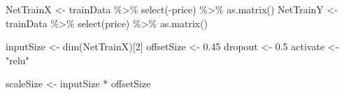 \documentclass[
]{article}
\newenvironment{Shaded}{\begin{snugshade}}{\end{snugshade}}
\newcommand{\DecValTok}[1]{\textcolor[rgb]{0.00,0.00,0.81}{#1}}
\newcommand{\FloatTok}[1]{\textcolor[rgb]{0.00,0.00,0.81}{#1}}
\newcommand{\FunctionTok}[1]{\textcolor[rgb]{0.00,0.00,0.00}{#1}}
\newcommand{\NormalTok}[1]{#1}
\newcommand{\OtherTok}[1]{\textcolor[rgb]{0.56,0.35,0.01}{#1}}
\newcommand{\SpecialCharTok}[1]{\textcolor[rgb]{0.00,0.00,0.00}{#1}}
\newcommand{\StringTok}[1]{\textcolor[rgb]{0.31,0.60,0.02}{#1}}
\begin{document}
\begin{Shaded}
\begin{Highlighting}[]
\NormalTok{NetTrainX }\OtherTok{\textless{}{-}}\NormalTok{ trainData }\SpecialCharTok{\%\textgreater{}\%} \FunctionTok{select}\NormalTok{(}\SpecialCharTok{{-}}\NormalTok{price) }\SpecialCharTok{\%\textgreater{}\%} \FunctionTok{as.matrix}\NormalTok{() }
\NormalTok{NetTrainY }\OtherTok{\textless{}{-}}\NormalTok{ trainData }\SpecialCharTok{\%\textgreater{}\%} \FunctionTok{select}\NormalTok{(price) }\SpecialCharTok{\%\textgreater{}\%} \FunctionTok{as.matrix}\NormalTok{()}

\NormalTok{inputSize }\OtherTok{\textless{}{-}} \FunctionTok{dim}\NormalTok{(NetTrainX)[}\DecValTok{2}\NormalTok{] }
\NormalTok{offsetSize }\OtherTok{\textless{}{-}} \FloatTok{0.45}
\NormalTok{dropout }\OtherTok{\textless{}{-}} \FloatTok{0.5}
\NormalTok{activate }\OtherTok{\textless{}{-}} \StringTok{"relu"}

\NormalTok{scaleSize }\OtherTok{\textless{}{-}}\NormalTok{ inputSize }\SpecialCharTok{*}\NormalTok{ offsetSize}


\end{Highlighting}
\end{Shaded}
\end{document}
